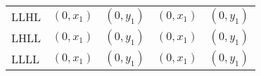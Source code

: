 \begin{tabular}{lrrrr}
LLHL  & \multicolumn{1}{l}{$( 0 , x_1 )$} & \multicolumn{1}{l}{$( 0 , y_1 )$} & \multicolumn{1}{l}{$( 0 , x_1 )$} & \multicolumn{1}{l}{$( 0 , y_1 )$} \\
LHLL  & \multicolumn{1}{l}{$( 0 , x_1 )$} & \multicolumn{1}{l}{$( 0 , y_1 )$} & \multicolumn{1}{l}{$( 0 , x_1 )$} & \multicolumn{1}{l}{$( 0 , y_1 )$} \\
LLLL  & \multicolumn{1}{l}{$( 0 , x_1 )$} & \multicolumn{1}{l}{$( 0 , y_1 )$} & \multicolumn{1}{l}{$( 0 , x_1 )$} & \multicolumn{1}{l}{$( 0 , y_1 )$} \\
\bottomrule
\end{tabular}%
